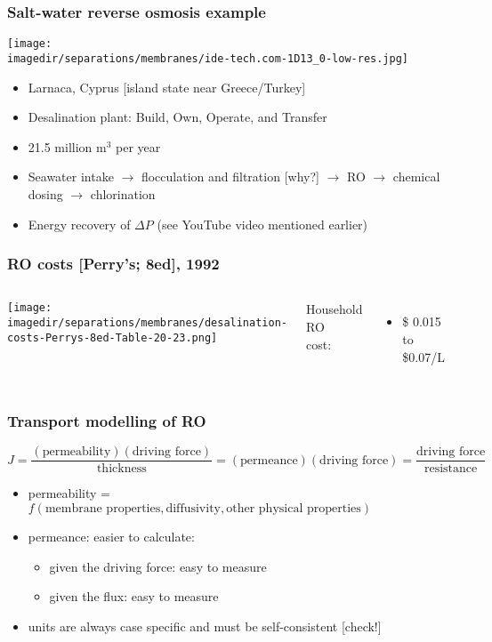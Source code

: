 \begin{frame}\frametitle{Salt-water reverse osmosis example}
	\texttt{[image: \\imagedir/separations/membranes/ide-tech.com-1D13\_0-low-res.jpg]}
	\begin{itemize}
		\item	Larnaca, Cyprus [island state near Greece/Turkey]
		\item	Desalination plant: Build, Own, Operate, and Transfer
		\item	21.5 million $\text{m}^3$ per year
		\item	Seawater intake $\rightarrow$ flocculation and filtration [why?] $\rightarrow$ RO $\rightarrow$ chemical dosing $\rightarrow$ chlorination
		\item	Energy recovery of $\Delta P$ {\tiny (see YouTube video mentioned earlier)}
	\end{itemize}	
\end{frame}

\begin{frame}\frametitle{RO costs [Perry's; 8ed], 1992}
	\begin{columns}[t]
			\begin{center}
				\texttt{[image: \\imagedir/separations/membranes/desalination-costs-Perrys-8ed-Table-20-23.png]}
			\end{center}
			Household RO\\
			cost:			
			\begin{itemize}
				\item	\$ 0.015 to \$0.07/L %
			\end{itemize}
	\end{columns}	
\end{frame}

\begin{frame}\frametitle{Transport modelling of RO}
	{\color{myOrange}{Symbolically:}}
	{ \small
	\[
		J = \frac{(\text{permeability})(\text{driving force})}{\text{thickness}} = \displaystyle (\text{permeance})(\text{driving force}) = \displaystyle \frac{\text{driving force}}{\text{resistance}} 
	\]
	}
	\begin{itemize}
		\item	permeability = $f(\text{membrane properties}, \text{diffusivity}, \text{other physical properties})$
		\item	permeance: easier to calculate:
		\begin{itemize}
			\item	given the driving force: easy to measure
			\item	given the flux: easy to measure
		\end{itemize}
		\item	units are always case specific and must be self-consistent [check!]
	\end{itemize}
\end{frame}

